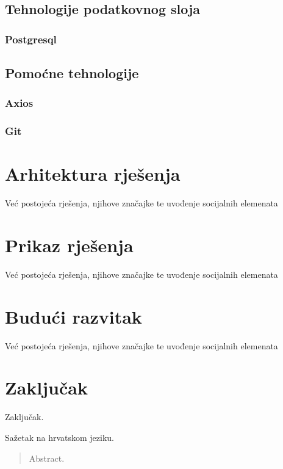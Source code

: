 \documentclass[times, utf8, zavrsni]{fer}
\begin{document}
	\section{Tehnologije podatkovnog sloja}
		\subsection{Postgresql}
	
	\section{Pomoćne tehnologije}
		\subsection{Axios}
		\subsection{Git}

\chapter{Arhitektura rješenja}
Već postojeća rješenja, njihove značajke te uvođenje socijalnih elemenata

\chapter{Prikaz rješenja}
Već postojeća rješenja, njihove značajke te uvođenje socijalnih elemenata

\chapter{Budući razvitak}
Već postojeća rješenja, njihove značajke te uvođenje socijalnih elemenata

\chapter{Zaključak}
Zaključak.




\begin{sazetak}
Sažetak na hrvatskom jeziku.

\end{sazetak}

\begin{abstract}
Abstract.

\end{abstract}
\end{document}
